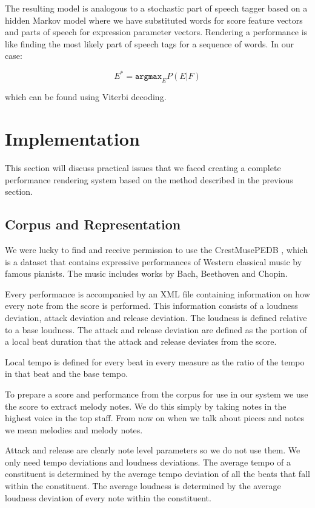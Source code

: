 \documentclass[a4paper,10pt]{article}
\begin{document}
The resulting model is analogous to a stochastic part of speech tagger based on a hidden Markov model where we have substituted words for score feature vectors and parts of speech for expression parameter vectors. Rendering a performance is like finding the most likely part of speech tags for a sequence of words. In our case:

\[E^* = \texttt{argmax}_E P(E|F)\]

which can be found using Viterbi decoding.

\section{Implementation}
\label{sec:implementation}

This section will discuss practical issues that we faced creating a complete performance rendering system based on the method described in the previous section.

\subsection{Corpus and Representation}
\label{sec:corpus}
We were lucky to find and receive permission to use the CrestMusePEDB \cite{hashida2008new}, which is a dataset that contains expressive performances of Western classical music by famous pianists. The music includes works by Bach, Beethoven and Chopin.

Every performance is accompanied by an XML file containing information on how every note from the score is performed. This information consists of a loudness deviation, attack deviation and release deviation. The loudness is defined relative to a base loudness. The attack and release deviation are defined as the portion of a local beat duration that the attack and release deviates from the score. 

Local tempo is defined for every beat in every measure as the ratio of the tempo in that beat and the base tempo. 

To prepare a score and performance from the corpus for use in our system we use the score to extract melody notes. We do this simply by taking notes in the highest voice in the top staff. From now on when we talk about pieces and notes we mean melodies and melody notes.

Attack and release are clearly note level parameters so we do not use them. We only need tempo deviations and loudness deviations. The average tempo of a constituent is determined by the average tempo deviation of all the beats that fall within the constituent. The average loudness is determined by the average loudness deviation of every note within the constituent.
\end{document}
